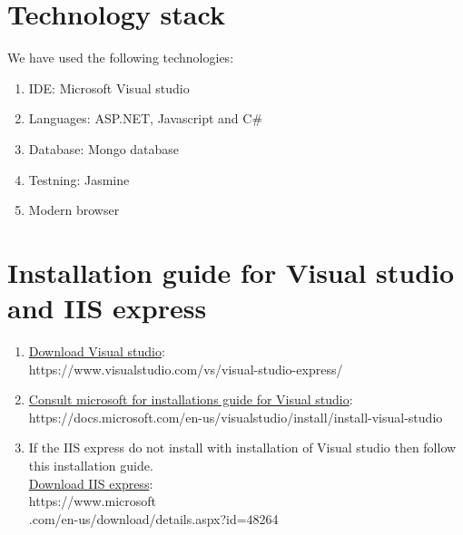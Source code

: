 \section{Technology stack}
We have used the following technologies:

\begin{enumerate}
    \item IDE: Microsoft Visual studio
    \item Languages: ASP.NET, Javascript and C\#
    \item Database: Mongo database
    \item Testning: Jasmine
    \item Modern browser
\end{enumerate}





\section{Installation guide for Visual studio and IIS express}
\label{sec:installation_guide_visual_studio}


\begin{enumerate}   
    \item  \href{https://www.visualstudio.com/vs/visual-studio-express/}{Download Visual studio}: \\ https://www.visualstudio.com/vs/visual-studio-express/ 
    
    \item \href{https://docs.microsoft.com/en-us/visualstudio/install/install-visual-studio}{Consult microsoft  for installations guide for Visual studio}:\\
    https://docs.microsoft.com/en-us/visualstudio/install/install-visual-studio
    
    \item If the IIS express do not install with installation of Visual studio then follow this installation guide. \\ 
    
    \href{https://www.microsoft.com/en-us/download/details.aspx?id=48264 }{Download IIS express}: \\
    https://www.microsoft\\.com/en-us/download/details.aspx?id=48264        
\end{enumerate}


